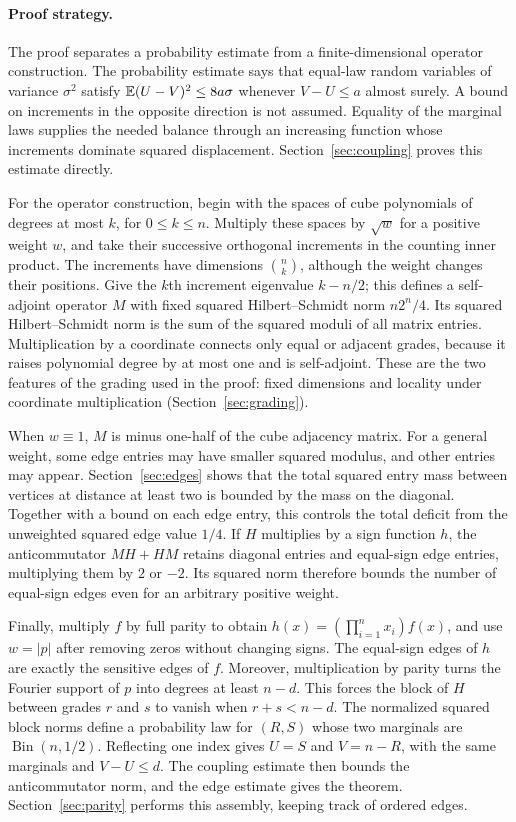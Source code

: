 \paragraph{Proof strategy.}
The proof separates a probability estimate from a finite-dimensional
operator construction. The probability estimate says that equal-law
random variables of variance $\sigma^2$ satisfy
$\mathbb E(U-V)^2\le8a\sigma$ whenever $V-U\le a$ almost surely.
A bound on increments in the opposite direction is not assumed.
Equality of the marginal laws supplies the needed balance through an
increasing function whose increments dominate squared displacement.
Section~\ref{sec:coupling} proves this estimate directly.

For the operator construction, begin with the spaces of cube polynomials
of degrees at most $k$, for $0\le k\le n$. Multiply these spaces by
$\sqrt w$ for a positive weight $w$, and take their successive orthogonal
increments in the counting inner product. The increments have dimensions
$\binom nk$, although the weight changes their positions. Give the
$k$th increment eigenvalue $k-n/2$; this defines a self-adjoint operator
$M$ with fixed squared Hilbert--Schmidt norm $n2^n/4$.
Its squared Hilbert--Schmidt norm is the sum of the squared moduli of
all matrix entries.
Multiplication by a coordinate connects only equal or adjacent grades,
because it raises polynomial degree by at most one and is self-adjoint.
These are the two features of the grading used in the proof: fixed
dimensions and locality under coordinate multiplication
(Section~\ref{sec:grading}).

When $w\equiv1$, $M$ is minus one-half of the cube adjacency matrix.
For a general weight, some edge entries may have smaller squared modulus,
and other entries may appear. Section~\ref{sec:edges} shows that the total squared
entry mass between vertices at distance at least two is bounded by the
mass on the diagonal.
Together with a bound on each edge entry, this controls the total deficit
from the unweighted squared edge value $1/4$.
If $H$ multiplies by a sign function $h$, the anticommutator $MH+HM$
retains diagonal entries and equal-sign edge entries, multiplying them by
$2$ or $-2$. Its squared norm therefore bounds the number of equal-sign
edges even for an arbitrary positive weight.

Finally, multiply $f$ by full parity to obtain
$h(x)=(\prod_{i=1}^n x_i)f(x)$, and use $w=|p|$ after removing zeros
without changing signs. The equal-sign edges of $h$ are exactly the
sensitive edges of $f$. Moreover, multiplication by parity turns the
Fourier support of $p$ into degrees at least $n-d$.
This forces the block of $H$ between grades $r$ and $s$ to vanish when
$r+s<n-d$. The normalized squared block norms define a probability law
for $(R,S)$ whose two marginals are $\operatorname{Bin}(n,1/2)$.
Reflecting one index gives $U=S$ and $V=n-R$, with the same marginals and
$V-U\le d$. The coupling estimate then bounds the anticommutator norm,
and the edge estimate gives the theorem. Section~\ref{sec:parity}
performs this assembly, keeping track of ordered edges.

